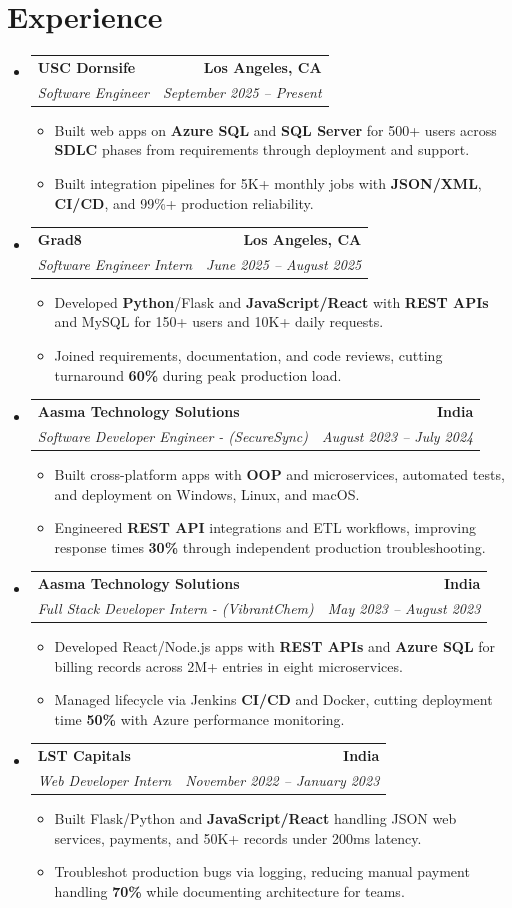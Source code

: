 \documentclass[letterpaper,10pt]{article}
\makeatletter
\newcommand{\resumeItem}[1]{\item\small{{#1 \vspace{-2pt}}}}
\newcommand{\resumeSubheading}[4]{\vspace{-1pt}\item\begin{tabular*}{1.0\textwidth}[t]{l@{\extracolsep{\fill}}r}\textbf{#1} & \textbf{\small #2} \\\textit{\small#3} & \textit{\small #4} \\\end{tabular*}\vspace{-2pt}}
\newcommand{\resumeSubHeadingListStart}{\begin{itemize}[leftmargin=0.0in, label={}]}
\newcommand{\resumeSubHeadingListEnd}{\end{itemize}}
\newcommand{\resumeItemListStart}{\begin{itemize}[leftmargin=0.15in,label=\textbullet,itemsep=2pt,topsep=0pt,parsep=0pt,partopsep=0pt]}
\newcommand{\resumeItemListEnd}{\end{itemize}\vspace{-4pt}}
\makeatother
\begin{document}
\section{Experience}
\resumeSubHeadingListStart
\resumeSubheading{USC Dornsife}{Los Angeles, CA}{Software Engineer}{September 2025 -- Present}
\resumeItemListStart
\resumeItem{Built web apps on \textbf{Azure SQL} and \textbf{SQL Server} for 500+ users across \textbf{SDLC} phases from requirements through deployment and support.}
\resumeItem{Built integration pipelines for 5K+ monthly jobs with \textbf{JSON/XML}, \textbf{CI/CD}, and 99\%+ production reliability.}
\resumeItemListEnd
\resumeSubheading{Grad8}{Los Angeles, CA}{Software Engineer Intern}{June 2025 -- August 2025}
\resumeItemListStart
\resumeItem{Developed \textbf{Python}/Flask and \textbf{JavaScript/React} with \textbf{REST APIs} and MySQL for 150+ users and 10K+ daily requests.}
\resumeItem{Joined requirements, documentation, and code reviews, cutting turnaround \textbf{60\%} during peak production load.}
\resumeItemListEnd
\resumeSubheading{Aasma Technology Solutions}{India}{Software Developer Engineer - (SecureSync)}{August 2023 -- July 2024}
\resumeItemListStart
\resumeItem{Built cross-platform apps with \textbf{OOP} and microservices, automated tests, and deployment on Windows, Linux, and macOS.}
\resumeItem{Engineered \textbf{REST API} integrations and ETL workflows, improving response times \textbf{30\%} through independent production troubleshooting.}
\resumeItemListEnd
\resumeSubheading{Aasma Technology Solutions}{India}{Full Stack Developer Intern - (VibrantChem)}{May 2023 -- August 2023}
\resumeItemListStart
\resumeItem{Developed React/Node.js apps with \textbf{REST APIs} and \textbf{Azure SQL} for billing records across 2M+ entries in eight microservices.}
\resumeItem{Managed lifecycle via Jenkins \textbf{CI/CD} and Docker, cutting deployment time \textbf{50\%} with Azure performance monitoring.}
\resumeItemListEnd
\resumeSubheading{LST Capitals}{India}{Web Developer Intern}{November 2022 -- January 2023}
\resumeItemListStart
\resumeItem{Built Flask/Python and \textbf{JavaScript/React} handling JSON web services, payments, and 50K+ records under 200ms latency.}
\resumeItem{Troubleshot production bugs via logging, reducing manual payment handling \textbf{70\%} while documenting architecture for teams.}
\resumeItemListEnd
\resumeSubHeadingListEnd
\vspace{-6pt}
\end{document}
